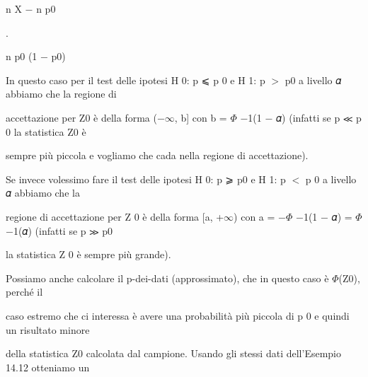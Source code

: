 \documentclass[a4paper,portrait,12pt]{article}
\begin{document}
\begin{flushleft}
n X $-$ n p0
\end{flushleft}


.


\begin{flushleft}
n p0 (1 $-$ p0)
\end{flushleft}





\begin{flushleft}
In questo caso per il test delle ipotesi H 0: p ⩽ p 0 e H 1: p $>$ p0 a livello 𝛼 abbiamo che la regione di
\end{flushleft}


\begin{flushleft}
accettazione per Z0 \`{e} della forma ($-$$\infty$, b] con b = $\Phi$ $-$1(1 $-$ 𝛼) (infatti se p ≪ p 0 la statistica Z0 \`{e}
\end{flushleft}


\begin{flushleft}
sempre più piccola e vogliamo che cada nella regione di accettazione).
\end{flushleft}


\begin{flushleft}
Se invece volessimo fare il test delle ipotesi H 0: p ⩾ p0 e H 1: p $<$ p 0 a livello 𝛼 abbiamo che la
\end{flushleft}


\begin{flushleft}
regione di accettazione per Z 0 \`{e} della forma [a, +$\infty$) con a = $-$$\Phi$ $-$1(1 $-$ 𝛼) = $\Phi$ $-$1(𝛼) (infatti se p ≫ p0
\end{flushleft}


\begin{flushleft}
la statistica Z 0 \`{e} sempre più grande).
\end{flushleft}


\begin{flushleft}
Possiamo anche calcolare il p-dei-dati (approssimato), che in questo caso \`{e} $\Phi$(Z0), perch\'{e} il
\end{flushleft}


\begin{flushleft}
caso estremo che ci interessa \`{e} avere una probabilit\`{a} più piccola di p 0 e quindi un risultato minore
\end{flushleft}


\begin{flushleft}
della statistica Z0 calcolata dal campione. Usando gli stessi dati dell'Esempio 14.12 otteniamo un
\end{flushleft}
\end{document}
